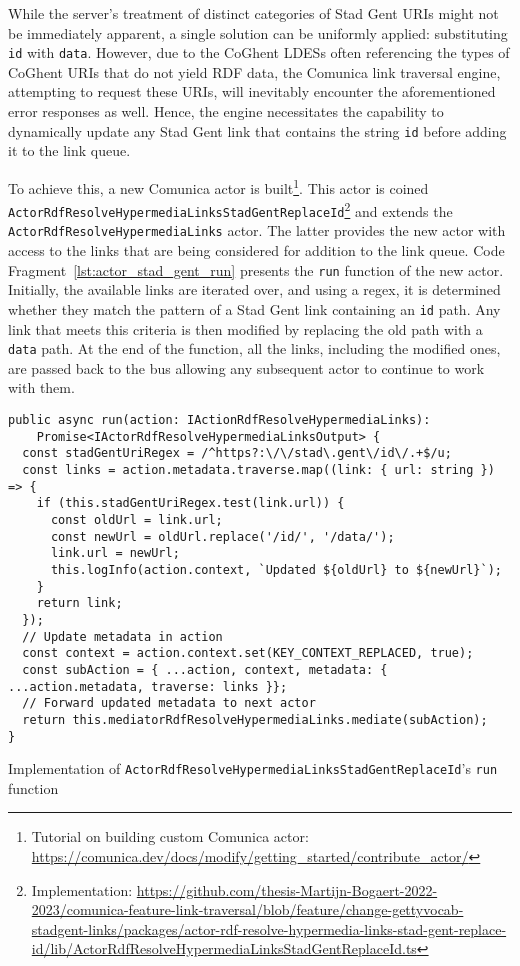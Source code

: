 While the server's treatment of distinct categories of Stad Gent URIs might not be immediately apparent, a single solution can be uniformly applied: substituting \texttt{id} with \texttt{data}. However, due to the CoGhent LDESs often referencing the types of CoGhent URIs that do not yield RDF data, the Comunica link traversal engine, attempting to request these URIs, will inevitably encounter the aforementioned error responses as well. Hence, the engine necessitates the capability to dynamically update any Stad Gent link that contains the string \texttt{id} before adding it to the link queue.

To achieve this, a new Comunica actor is built\footnote{Tutorial on building custom Comunica actor: \url{https://comunica.dev/docs/modify/getting_started/contribute_actor/}}. This actor is coined \linebreak\texttt{ActorRdfResolveHypermediaLinksStadGentReplaceId}\footnote{Implementation: \url{https://github.com/thesis-Martijn-Bogaert-2022-2023/comunica-feature-link-traversal/blob/feature/change-gettyvocab-stadgent-links/packages/actor-rdf-resolve-hypermedia-links-stad-gent-replace-id/lib/ActorRdfResolveHypermediaLinksStadGentReplaceId.ts}} and extends the \linebreak\texttt{ActorRdfResolveHypermediaLinks} actor. The latter provides the new actor with access to the links that are being considered for addition to the link queue. Code Fragment~\ref{lst:actor_stad_gent_run} presents the \texttt{run} function of the new actor. Initially, the available links are iterated over, and using a regex, it is determined whether they match the pattern of a Stad Gent link containing an \texttt{id} path. Any link that meets this criteria is then modified by replacing the old path with a \texttt{data} path. At the end of the function, all the links, including the modified ones, are passed back to the bus allowing any subsequent actor to continue to work with them.

\begin{listing}[htbp]
    \begin{verbatim}
public async run(action: IActionRdfResolveHypermediaLinks):
    Promise<IActorRdfResolveHypermediaLinksOutput> {
  const stadGentUriRegex = /^https?:\/\/stad\.gent\/id\/.+$/u;
  const links = action.metadata.traverse.map((link: { url: string }) => {
    if (this.stadGentUriRegex.test(link.url)) {
      const oldUrl = link.url;
      const newUrl = oldUrl.replace('/id/', '/data/');
      link.url = newUrl;
      this.logInfo(action.context, `Updated ${oldUrl} to ${newUrl}`);
    }
    return link;
  });
  // Update metadata in action
  const context = action.context.set(KEY_CONTEXT_REPLACED, true);
  const subAction = { ...action, context, metadata: { ...action.metadata, traverse: links }};
  // Forward updated metadata to next actor
  return this.mediatorRdfResolveHypermediaLinks.mediate(subAction);
}
    \end{verbatim}
    \caption{Implementation of \texttt{ActorRdfResolveHypermediaLinksStadGentReplaceId}'s \texttt{run} function}
    \label{lst:actor_stad_gent_run}
\end{listing}

